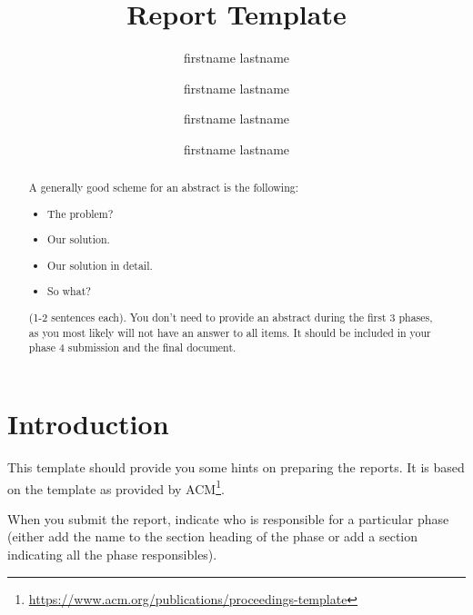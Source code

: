 \documentclass[sigconf]{acmart}
\begin{document}
\title{Report Template}

\author{firstname lastname}
\affiliation{\institution{}}
  
\author{firstname lastname}
\affiliation{\institution{}}
  
\author{firstname lastname}
\affiliation{\institution{}}
  
\author{firstname lastname}
\affiliation{\institution{}}

\renewcommand{\shortauthors}{team XX}

\begin{abstract}
A generally good scheme for an abstract is the following:
\begin{itemize}
 \item The problem?
 \item Our solution.
 \item Our solution in detail.
 \item So what?
\end{itemize}
(1-2 sentences each). 
You don't need to provide an abstract during the first 3 phases, as you most likely will not have an answer to all items.
It should be included in your phase 4 submission and the final document.
\end{abstract}


\maketitle
\section*{Introduction}
This template should provide you some hints on preparing the reports. 
It is based on the template as provided by ACM\footnote{\url{https://www.acm.org/publications/proceedings-template}}.

When you submit the report, indicate who is responsible for a particular phase (either add the name to the section heading of the phase or add a section indicating all the phase responsibles).
\end{document}
